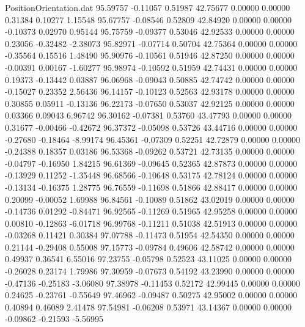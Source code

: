 \begin{filecontents}{PositionOrientation.dat}
  95.59757   -0.11057    0.51987    42.75677    0.00000    0.00000    0.31384    0.10277    1.15548
  95.67757   -0.08546    0.52809    42.84920    0.00000    0.00000   -0.10373    0.02970    0.95144
  95.75759   -0.09377    0.53046    42.92533    0.00000    0.00000    0.23056   -0.32482   -2.38073
  95.82971   -0.07714    0.50704    42.75364    0.00000    0.00000   -0.35564    0.15516    1.48490
  95.90976   -0.10561    0.51946    42.87250    0.00000    0.00000   -0.00391    0.00167   -1.60277
  95.98974   -0.10592    0.51959    42.74431    0.00000    0.00000    0.19373   -0.13442    0.03887
  96.06968   -0.09043    0.50885    42.74742    0.00000    0.00000   -0.15027    0.23352    2.56436
  96.14157   -0.10123    0.52563    42.93178    0.00000    0.00000    0.30855    0.05911   -0.13136
  96.22173   -0.07650    0.53037    42.92125    0.00000    0.00000    0.03366    0.09043    6.96742
  96.30162   -0.07381    0.53760    43.47793    0.00000    0.00000    0.31677   -0.00466   -0.42672
  96.37372   -0.05098    0.53726    43.44716    0.00000    0.00000   -0.27680   -0.18464   -8.99174
  96.45361   -0.07309    0.52251    42.72879    0.00000    0.00000   -0.24388    0.18357    0.03186
  96.53368   -0.09262    0.53721    42.73135    0.00000    0.00000   -0.04797   -0.16950    1.84215
  96.61369   -0.09645    0.52365    42.87873    0.00000    0.00000   -0.13929    0.11252   -1.35448
  96.68566   -0.10648    0.53175    42.78124    0.00000    0.00000   -0.13134   -0.16375    1.28775
  96.76559   -0.11698    0.51866    42.88417    0.00000    0.00000    0.20099   -0.00052    1.69988
  96.84561   -0.10089    0.51862    43.02019    0.00000    0.00000   -0.14736    0.01292   -0.84471
  96.92565   -0.11269    0.51965    42.95258    0.00000    0.00000    0.00810   -0.12863   -6.01718
  96.99768   -0.11211    0.51038    42.51913    0.00000    0.00000   -0.03268    0.11421    0.30384
  97.07788   -0.11473    0.51954    42.54350    0.00000    0.00000    0.21144   -0.29408    0.55008
  97.15773   -0.09784    0.49606    42.58742    0.00000    0.00000    0.49937    0.36541    6.55016
  97.23755   -0.05798    0.52523    43.11025    0.00000    0.00000   -0.26028    0.23174    1.79986
  97.30959   -0.07673    0.54192    43.23990    0.00000    0.00000   -0.47136   -0.25183   -3.06080
  97.38978   -0.11453    0.52172    42.99445    0.00000    0.00000    0.24625   -0.23761   -0.55649
  97.46962   -0.09487    0.50275    42.95002    0.00000    0.00000    0.40894    0.46089    2.41478
  97.54981   -0.06208    0.53971    43.14367    0.00000    0.00000   -0.09862   -0.21593   -5.56995

\end{filecontents}
